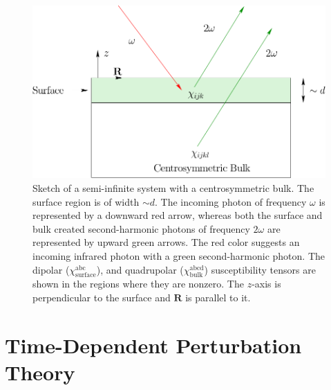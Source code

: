\begin{figure}[t]
\centering
\includegraphics[scale=0.6]{content/figures/diag-system}
\caption[Sketch of a semi-infinite system with a centrosymmetric bulk.]
{Sketch of a semi-infinite system with a centrosymmetric bulk. The
surface region is of width $\sim d$. The incoming photon of frequency $\omega$
is represented by a downward red arrow, whereas both the surface and bulk
created second-harmonic photons of frequency $2\omega$ are represented by upward
green arrows. The red color suggests an incoming infrared photon with a green
second-harmonic photon. The dipolar ($\chi^{\mathrm{abc}}_{\mathrm{surface}}$),
and quadrupolar ($\chi^{\mathrm{abcd}}_{\mathrm{bulk}}$) susceptibility tensors
are shown in the regions where they are nonzero. The $z$-axis is perpendicular
to the surface and $\mathbf{R}$ is parallel to it.}
\label{fsystem}
\end{figure}



\section{Time-Dependent Perturbation Theory}\label{tdpt}

